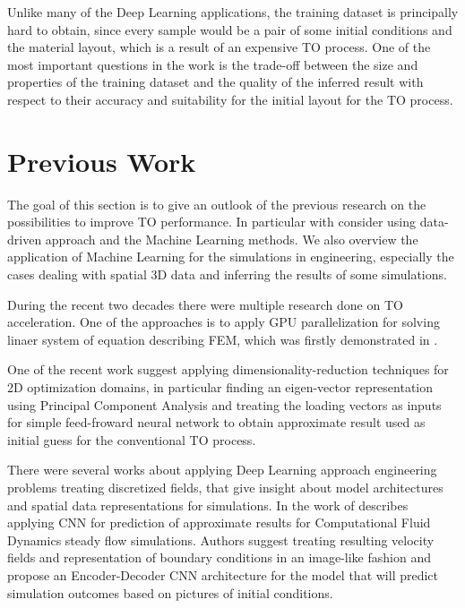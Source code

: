 Unlike many of the Deep Learning applications, the training dataset is principally hard to obtain, since every sample would be a pair of some initial conditions and the material layout, which is a result of an expensive TO process. 
One of the most important questions in the work is the trade-off between the size and properties of the training dataset and the quality of the inferred result with respect to their accuracy and suitability for the initial layout for the TO process.


\section{Previous Work}

The goal of this section is to give an outlook of the previous research on the possibilities to improve TO performance.
In particular with consider using data-driven approach and the Machine Learning methods.
We also overview the application of Machine Learning for the simulations in engineering, especially the cases dealing with spatial 3D data and inferring the results of some simulations.
\medskip

During the recent two decades there were multiple research done on TO acceleration.
One of the approaches is to apply GPU parallelization for solving linaer system of equation describing FEM, which was firstly demonstrated in \cite{}.

One of the recent work \cite{bibl:prevwork_pca} suggest applying dimensionality-reduction techniques for 2D optimization domains, in particular finding an eigen-vector representation using Principal Component Analysis\cite{} and treating the loading vectors as inputs for simple feed-froward neural network to obtain approximate result used as initial guess for the conventional TO process.
\medskip

There were several works about applying Deep Learning approach engineering problems treating discretized fields, that give insight about model architectures and spatial data representations for simulations. 
In the work of \cite{prev:prevwork_cnncfd} describes applying CNN for prediction of approximate results for Computational Fluid Dynamics steady flow simulations. 
Authors suggest treating resulting velocity fields and representation of boundary conditions in an image-like fashion and propose an Encoder-Decoder CNN architecture for the model that will predict simulation outcomes based on pictures of initial conditions.




